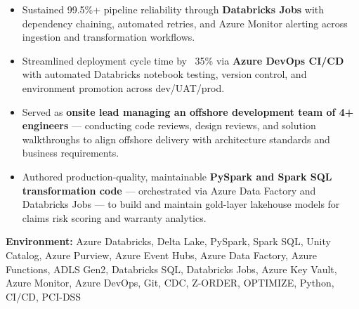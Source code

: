 \documentclass[a4paper,10pt]{article}
\begin{document}
\begin{itemize}
    \item Sustained 99.5\%+ pipeline reliability through \textbf{Databricks Jobs} with dependency chaining, automated retries, and Azure Monitor alerting across ingestion and transformation workflows.
    \item Streamlined deployment cycle time by ~35\% via \textbf{Azure DevOps CI/CD} with automated Databricks notebook testing, version control, and environment promotion across dev/UAT/prod.
    \item Served as \textbf{onsite lead managing an offshore development team of 4+ engineers} — conducting code reviews, design reviews, and solution walkthroughs to align offshore delivery with architecture standards and business requirements.
    \item Authored production-quality, maintainable \textbf{PySpark and Spark SQL transformation code} — orchestrated via Azure Data Factory and Databricks Jobs — to build and maintain gold-layer lakehouse models for claims risk scoring and warranty analytics.
\end{itemize}

\textbf{Environment:} Azure Databricks, Delta Lake, PySpark, Spark SQL, Unity Catalog, Azure Purview, Azure Event Hubs, Azure Data Factory, Azure Functions, ADLS Gen2, Databricks SQL, Databricks Jobs, Azure Key Vault, Azure Monitor, Azure DevOps, Git, CDC, Z-ORDER, OPTIMIZE, Python, CI/CD, PCI-DSS
\end{document}
